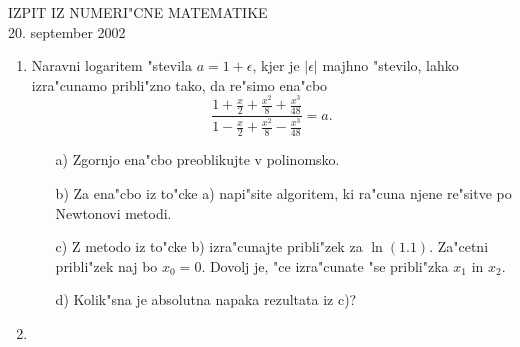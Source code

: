 \documentclass[12pt,a4paper]{article}
\begin{document}
\begin{center}
  IZPIT IZ NUMERI"CNE MATEMATIKE\\
  20. september 2002
\end{center}

\begin{enumerate}

  \item Naravni logaritem "stevila $a=1+\epsilon$, kjer je $|\epsilon|$
    majhno "stevilo, lahko izra"cunamo pribli"zno tako, da
    re"simo ena"cbo
    $$\frac{1+\frac{x}{2}+\frac{x^2}{8}+\frac{x^3}{48}}
      {1-\frac{x}{2}+\frac{x^2}{8}-\frac{x^3}{48}}=a.
    $$
    \begin{itemize}
      \item[a)] Zgornjo ena"cbo preoblikujte v polinomsko.
      \item[b)] Za ena"cbo iz to"cke a) napi"site algoritem, ki
        ra"cuna njene re"sitve po Newtonovi metodi.
      \item[c)] Z metodo iz to"cke b) izra"cunajte pribli"zek
	za $\ln(1.1)$. Za"cetni pribli"zek naj bo $x_0=0$.
        Dovolj je, "ce izra"cunate "se pribli"zka $x_1$ in $x_2$.
      \item[d)] Kolik"sna je absolutna napaka rezultata iz c)?
    \end{itemize}
  \item  
\end{enumerate}
\end{document}
